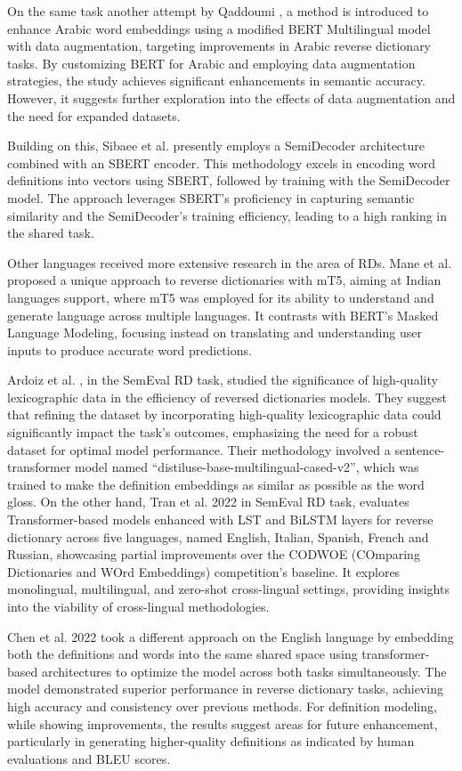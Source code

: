 \documentclass[15pt]{article}
\begin{document}
On the same task another attempt by Qaddoumi \cite{Qaddoumi2023}, a method is introduced to enhance Arabic word embeddings using a modified BERT Multilingual model with data augmentation, targeting improvements in Arabic reverse dictionary tasks. By customizing BERT for Arabic and employing data augmentation strategies, the study achieves significant enhancements in semantic accuracy. However, it suggests further exploration into the effects of data augmentation and the need for expanded datasets.

Building on this, Sibaee et al. \cite{Sibaee2023} presently employs a SemiDecoder architecture combined with an SBERT encoder. This methodology excels in encoding word definitions into vectors using SBERT, followed by training with the SemiDecoder model. The approach leverages SBERT's proficiency in capturing semantic similarity and the SemiDecoder's training efficiency, leading to a high ranking in the shared task.

Other languages received more extensive research in the area of RDs. Mane et al. \cite{Mane2022} proposed a unique approach to reverse dictionaries with mT5, aiming at Indian languages support, where mT5 was employed for its ability to understand and generate language across multiple languages. It contrasts with BERT's Masked Language Modeling, focusing instead on translating and understanding user inputs to produce accurate word predictions.

Ardoiz et al. \cite{Ardoiz2022}, in the SemEval RD task, studied the significance of high-quality lexicographic data in the efficiency of reversed dictionaries models. They suggest that refining the dataset by incorporating high-quality lexicographic data could significantly impact the task's outcomes, emphasizing the need for a robust dataset for optimal model performance. Their methodology involved a sentence-transformer model named “distiluse-base-multilingual-cased-v2”, which was trained to make the definition embeddings as similar as possible as the word gloss.
On the other hand, Tran et al. 2022 in SemEval RD task, evaluates Transformer-based models enhanced with LST and BiLSTM layers for reverse dictionary across five languages, named English, Italian, Spanish, French and Russian, showcasing partial improvements over the CODWOE (COmparing Dictionaries and WOrd Embeddings) competition's baseline. It explores monolingual, multilingual, and zero-shot cross-lingual settings, providing insights into the viability of cross-lingual methodologies.

Chen et al. 2022 \cite{Chen2022} took a different approach on the English language by embedding both the definitions and words into the same shared space using transformer-based architectures to optimize the model across both tasks simultaneously. The model demonstrated superior performance in reverse dictionary tasks, achieving high accuracy and consistency over previous methods. For definition modeling, while showing improvements, the results suggest areas for future enhancement, particularly in generating higher-quality definitions as indicated by human evaluations and BLEU scores.
\end{document}
